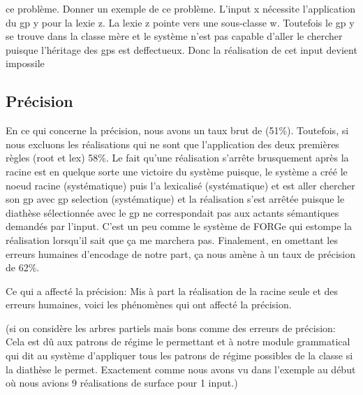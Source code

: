 ce problème. Donner un exemple de ce problème. L'input x nécessite l'application du gp y pour la lexie z. La lexie z pointe vers une sous-classe w. Toutefois le gp y se trouve dans la classe mère et le système n'est pas capable d'aller le chercher puisque l'héritage des gps est deffectueux. Donc la réalisation de cet input devient impossile

\subsection{Précision}

En ce qui concerne la précision, nous avons un taux brut de (51\%). Toutefois, si nous excluons les réalisations qui ne sont que l'application des deux premières règles (root et lex) 58\%. Le fait qu'une réalisation s'arrête brusquement après la racine est en quelque sorte une victoire du système puisque, le système a créé le noeud racine (systématique) puis l'a lexicalisé (systématique) et est aller chercher son gp avec gp selection (systématique) et la réalisation s'est arrêtée puisque le diathèse sélectionnée avec le gp ne correspondait pas aux actants sémantiques demandés par l'input. C'est un peu comme le système de FORGe qui estompe la réalisation lorsqu'il sait que ça me marchera pas. Finalement, en omettant les erreurs humaines d'encodage de notre part, ça nous amène à un taux de précision de 62\%.


Ce qui a affecté la précision:
Mis à part la réalisation de la racine seule et des erreurs humaines, voici les phénomènes qui ont affecté la précision.

(si on considère les arbres partiels mais bons comme des erreurs de précision: Cela est dû aux patrons de régime le permettant et à notre module grammatical qui dit au système d'appliquer tous les patrons de régime possibles de la classe si la diathèse le permet. Exactement comme nous avons vu dans l'exemple au début où nous avions 9 réalisations de surface pour 1 input.)

